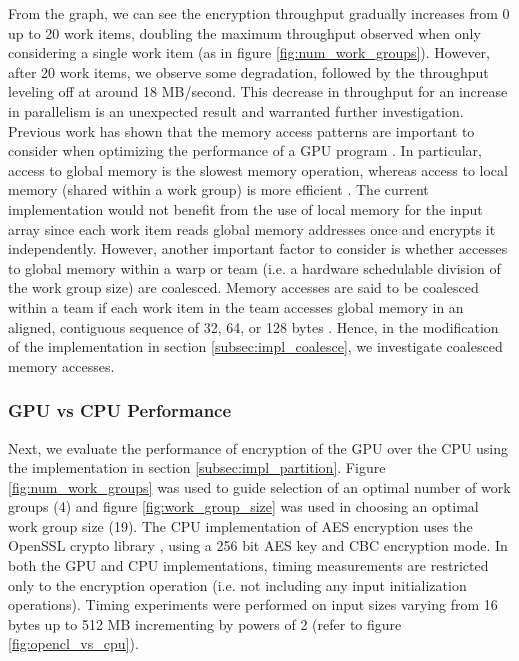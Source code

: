 \documentclass[conference,10pt]{IEEEtran}
\begin{document}
From the graph, we can see the encryption throughput gradually increases from 0 up to 20 work items, 
doubling the maximum throughput observed when only considering a single work item (as in figure 
\ref{fig:num_work_groups}).  However, after 20 work items, we observe some degradation, followed by 
the throughput leveling off at around 18 MB/second.  This decrease in throughput for 
an increase in parallelism is an unexpected result and warranted further investigation.  Previous 
work has shown that the memory access patterns are important to consider when optimizing the 
performance of a GPU program \cite{gpu_mem}. In particular, access to global memory is the slowest 
memory operation, whereas access to local memory (shared within a work group) is more efficient 
\cite{opencl_guide}.  The current implementation would not benefit from the use of local memory for 
the input array since each work item reads global memory addresses once and encrypts it 
independently.  However, another important factor to consider is whether accesses to global memory 
within a warp \cite{gpu_mem} or team \cite{opencl_guide} (i.e. a hardware schedulable division of 
the work group size) are coalesced.  Memory accesses are said to be coalesced within a team if each 
work item in the team accesses global memory in an aligned, contiguous sequence of 32, 64, or 128 
bytes \cite{nvidia_opencl}. Hence, in the modification of the implementation in section 
\ref{subsec:impl_coalesce}, we investigate coalesced memory accesses.  

\subsubsection{GPU vs CPU Performance}
\label{subsec:gpu_vs_cpu}

Next, we evaluate the performance of encryption of the GPU over the CPU using the implementation in 
section \ref{subsec:impl_partition}.   Figure \ref{fig:num_work_groups} was used to guide selection 
of an optimal number of work groups (4) and figure \ref{fig:work_group_size} was used in choosing an 
optimal work group size (19).  The CPU implementation of AES encryption uses the OpenSSL crypto 
library \cite{openssl}, using a 256 bit AES key and CBC encryption mode.  In both the GPU and CPU 
implementations, timing measurements are restricted only to the encryption operation (i.e. not 
including any input initialization operations).  Timing experiments were performed on input sizes 
varying from 16 bytes up to 512 MB incrementing by powers of 2 (refer to figure 
\ref{fig:opencl_vs_cpu}).
\end{document}
